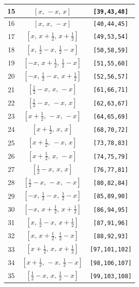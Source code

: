 \documentclass[fleqn,8pt]{jsarticle}
\begin{document}
\begin{longtable}{ccc}
15 & $\left[ x,\, - x,\, x \right]$ & {\tt [39,43,48]} \\ \hline
16 & $\left[ x,\, x,\, - x \right]$ & {\tt [40,44,45]} \\ \hline
17 & $\left[ x,\, x + \frac{1}{2},\, x + \frac{1}{2} \right]$ & {\tt [49,53,54]} \\ \hline
18 & $\left[ x,\, \frac{1}{2} - x,\, \frac{1}{2} - x \right]$ & {\tt [50,58,59]} \\ \hline
19 & $\left[ - x,\, x + \frac{1}{2},\, \frac{1}{2} - x \right]$ & {\tt [51,55,60]} \\ \hline
20 & $\left[ - x,\, \frac{1}{2} - x,\, x + \frac{1}{2} \right]$ & {\tt [52,56,57]} \\ \hline
21 & $\left[ \frac{1}{2} - x,\, x,\, - x \right]$ & {\tt [61,66,71]} \\ \hline
22 & $\left[ \frac{1}{2} - x,\, - x,\, x \right]$ & {\tt [62,63,67]} \\ \hline
23 & $\left[ x + \frac{1}{2},\, - x,\, - x \right]$ & {\tt [64,65,69]} \\ \hline
24 & $\left[ x + \frac{1}{2},\, x,\, x \right]$ & {\tt [68,70,72]} \\ \hline
25 & $\left[ x + \frac{1}{2},\, - x,\, x \right]$ & {\tt [73,78,83]} \\ \hline
26 & $\left[ x + \frac{1}{2},\, x,\, - x \right]$ & {\tt [74,75,79]} \\ \hline
27 & $\left[ \frac{1}{2} - x,\, x,\, x \right]$ & {\tt [76,77,81]} \\ \hline
28 & $\left[ \frac{1}{2} - x,\, - x,\, - x \right]$ & {\tt [80,82,84]} \\ \hline
29 & $\left[ - x,\, \frac{1}{2} - x,\, \frac{1}{2} - x \right]$ & {\tt [85,89,90]} \\ \hline
30 & $\left[ - x,\, x + \frac{1}{2},\, x + \frac{1}{2} \right]$ & {\tt [86,94,95]} \\ \hline
31 & $\left[ x,\, \frac{1}{2} - x,\, x + \frac{1}{2} \right]$ & {\tt [87,91,96]} \\ \hline
32 & $\left[ x,\, x + \frac{1}{2},\, \frac{1}{2} - x \right]$ & {\tt [88,92,93]} \\ \hline
33 & $\left[ x + \frac{1}{2},\, x,\, x + \frac{1}{2} \right]$ & {\tt [97,101,102]} \\ \hline
34 & $\left[ x + \frac{1}{2},\, - x,\, \frac{1}{2} - x \right]$ & {\tt [98,106,107]} \\ \hline
35 & $\left[ \frac{1}{2} - x,\, x,\, \frac{1}{2} - x \right]$ & {\tt [99,103,108]} \\ \hline

\end{longtable}
\end{document}
